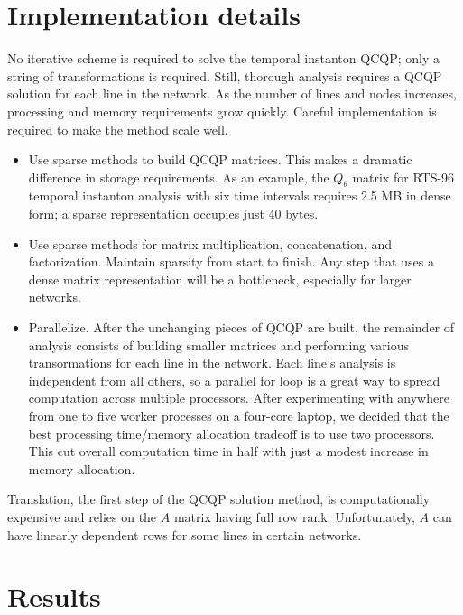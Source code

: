 \documentclass[conference]{IEEEtran}
\begin{document}
\section{Implementation details}
\label{sec:implementation}

No iterative scheme is required to solve the temporal instanton QCQP; only a string of transformations is required. Still, thorough analysis requires a QCQP solution for each line in the network. As the number of lines and nodes increases, processing and memory requirements grow quickly. Careful implementation is required to make the method scale well.

\begin{itemize}
    \item Use sparse methods to build QCQP matrices. This makes a dramatic difference in storage requirements. As an example, the $Q_\theta$ matrix for RTS-96 temporal instanton analysis with six time intervals requires 2.5 MB in dense form; a sparse representation occupies just 40 bytes.
    \item Use sparse methods for matrix multiplication, concatenation, and factorization. Maintain sparsity from start to finish. Any step that uses a dense matrix representation will be a bottleneck, especially for larger networks.
    \item Parallelize. After the unchanging pieces of QCQP are built, the remainder of analysis consists of building smaller matrices and performing various transormations for each line in the network. Each line's analysis is independent from all others, so a parallel for loop is a great way to spread computation across multiple processors. After experimenting with anywhere from one to five worker processes on a four-core laptop, we decided that the best processing time/memory allocation tradeoff is to use two processors. This cut overall computation time in half with just a modest increase in memory allocation.
\end{itemize}

Translation, the first step of the QCQP solution method, is computationally expensive and relies on the $A$ matrix having full row rank. Unfortunately, $A$ can have linearly dependent rows for some lines in certain networks.

\section{Results}\label{sec:results}
\end{document}

